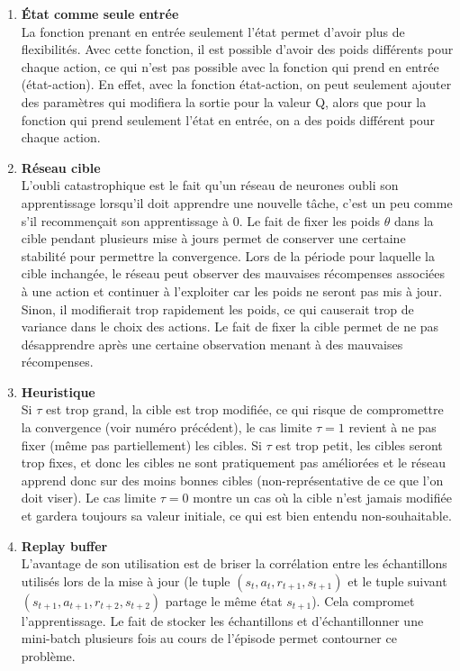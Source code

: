 \documentclass[letterpaper,11pt]{article}
\begin{document}
\begin{enumerate}[label=(\alph*)]

\item \textbf{État comme seule entrée}\\
La fonction prenant en entrée seulement l'état permet d'avoir plus de flexibilités.
Avec cette fonction, il est possible d'avoir des poids différents pour chaque action, ce qui n'est pas possible avec la fonction qui prend en entrée (état-action). En effet, avec la fonction état-action, on peut seulement ajouter des paramètres qui modifiera la sortie pour la valeur Q, alors que pour la fonction qui prend seulement l'état en entrée, on a des poids différent pour chaque action.

\item \textbf{Réseau cible}\\
L'oubli catastrophique est le fait qu'un réseau de neurones oubli son apprentissage lorsqu'il doit apprendre une nouvelle tâche, c'est un peu comme s'il recommençait son apprentissage à 0. Le fait de fixer les poids $\theta$ dans la cible pendant plusieurs mise à jours permet de conserver une certaine stabilité pour permettre la convergence. Lors de la période pour laquelle la cible inchangée, le réseau peut observer des mauvaises récompenses associées à une action et continuer à l'exploiter car les poids ne seront pas mis à jour. Sinon, il modifierait trop rapidement les poids, ce qui causerait trop de variance dans le choix des actions. Le fait de fixer la cible permet de ne pas désapprendre après une certaine observation menant à des mauvaises récompenses.  

\item \textbf{Heuristique}\\
Si $\tau$ est trop grand, la cible est trop modifiée, ce qui risque de compromettre la convergence (voir numéro précédent), le cas limite $\tau=1$ revient à ne pas fixer (même pas partiellement) les cibles. Si $\tau$ est trop petit, les cibles seront trop fixes, et donc les cibles ne sont pratiquement pas améliorées et le réseau apprend donc sur des moins bonnes cibles (non-représentative de ce que l'on doit viser). Le cas limite $\tau=0$ montre un cas où la cible n'est jamais modifiée et gardera toujours sa valeur initiale, ce qui est bien entendu non-souhaitable. 

\item \textbf{Replay buffer}\\
L'avantage de son utilisation est de briser la corrélation entre les échantillons utilisés lors de la mise à jour (le tuple $(s_t, a_t, r_{t+1}, s_{t+1})$ et le tuple suivant $(s_{t+1}, a_{t+1}, r_{t+2}, s_{t+2})$ partage le même état $s_{t+1}$). Cela compromet l'apprentissage. Le fait de stocker les échantillons et d'échantillonner une mini-batch plusieurs fois au cours de l'épisode permet contourner ce problème. 


\end{enumerate}
\end{document}

